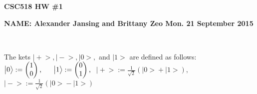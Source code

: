 \documentclass[11 pt]{article}
\theoremstyle{definition}
\theoremstyle{definition}
\def\ket#1{\big|{#1}\big>}
\begin{document}
\centerline{\bf CSC518  \hfill HW \#1}
\centerline{\bf NAME: Alexander Jansing and Brittany Zeo \hfill Mon. 21 September 2015}

\

\noindent
The kets $ \ket{+}, \ket{-}, \ket{0}, $ and $ \ket{1}$ are defined as follows:\\

\hspace*{.5cm}
\vspace*{.4cm} $\ket{0} := \left( \begin{matrix}
									1\\
									0
							   \end{matrix} \right) \text{, }
  \hspace*{.5cm} \ket{1} := \left( \begin{matrix}
									0\\
									1
							   \end{matrix} \right) \text{, }$
\hspace*{.5cm} $\ket{+} := \frac{1}{\sqrt{2}}(\ket{0} + \ket{1}) \text{, }$
\hspace*{.5cm} $\ket{-} := \frac{1}{\sqrt{2}}(\ket{0} - \ket{1})$
\end{document}
